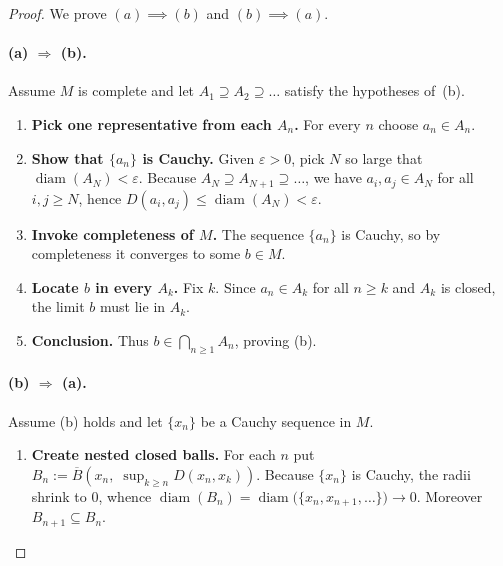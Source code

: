 \documentclass[12pt]{article}
\DeclareMathOperator{\diam}{diam}
\theoremstyle{definition} %
\theoremstyle{plain} %
\begin{document}
\begin{proof}
  We prove \((a)\!\implies\!(b)\) and \((b)\!\implies\!(a)\).

  \paragraph{\textbf{(a) $\boldsymbol{\Longrightarrow}$ (b).}}
  Assume $M$ is complete and let
  \(
      A_1 \supseteq A_2 \supseteq \dots
  \)
  satisfy the hypotheses of~(b).

  \begin{enumerate}[label=\arabic*.]
      \item \textbf{Pick one representative from each $A_n$.}  
            For every $n$ choose $a_n\in A_n$.

      \item \textbf{Show that $\{a_n\}$ is Cauchy.}  
            Given $\varepsilon>0$, pick
            $N$ so large that $\diam(A_N)<\varepsilon$.  
            Because $A_{N}\supseteq A_{N+1}\supseteq\dots$, we have
            $a_i,a_j\in A_N$ for all $i,j\ge N$, hence
            \(
                D(a_i,a_j)\le\diam(A_N)<\varepsilon.
            \)

      \item \textbf{Invoke completeness of $M$.}  
            The sequence $\{a_n\}$ is Cauchy, so by completeness it
            converges to some $b\in M$.

      \item \textbf{Locate $b$ in every $A_k$.}  
            Fix $k$.  Since $a_n\in A_k$ for all $n\ge k$ and $A_k$ is
            closed, the limit $b$ must lie in $A_k$.

      \item \textbf{Conclusion.}  
            Thus $b\in\bigcap_{n\ge1}A_n$, proving (b).
  \end{enumerate}

  \paragraph{\textbf{(b) $\boldsymbol{\Longrightarrow}$ (a).}}
  Assume (b) holds and let $\{x_n\}$ be a Cauchy sequence in $M$.

  \begin{enumerate}[label=\arabic*.]
      \item \textbf{Create nested closed balls.}  
            For each $n$ put
            \(
                B_n:=\overline{B}\!\left(x_n,\;
                \displaystyle\sup_{k\ge n}D(x_n,x_k)\right).
            \)
            Because $\{x_n\}$ is Cauchy, the radii shrink to $0$, whence
            \(
              \diam(B_n)=\diam\bigl(\{x_n,x_{n+1},\dots\}\bigr)\longrightarrow 0.
            \)
            Moreover $B_{n+1}\subseteq B_n$.


\end{enumerate}
\end{proof}
\end{document}
